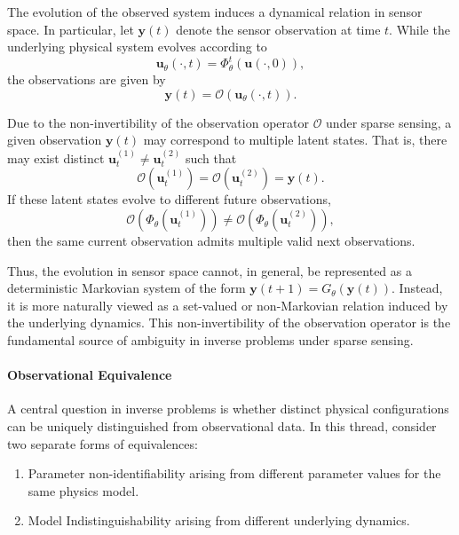 The evolution of the observed system induces a dynamical relation in sensor space. In particular, let $\mathbf{y}(t)$ denote the sensor observation at time $t$. While the underlying physical system evolves according to
\begin{equation}
\mathbf{u}_\theta(\cdot,t) = \Phi_\theta^t(\mathbf{u}(\cdot,0)), \nonumber
\end{equation}
the observations are given by
\begin{equation}
\mathbf{y}(t) = \mathcal{O}(\mathbf{u}_\theta(\cdot,t)). \nonumber
\end{equation}

Due to the non-invertibility of the observation operator $\mathcal{O}$ under sparse sensing, a given observation $\mathbf{y}(t)$ may correspond to multiple latent states. That is, there may exist distinct $\mathbf{u}_t^{(1)} \neq \mathbf{u}_t^{(2)}$ such that
\begin{equation}
\mathcal{O}(\mathbf{u}_t^{(1)}) = \mathcal{O}(\mathbf{u}_t^{(2)}) = \mathbf{y}(t). \nonumber
\end{equation}
If these latent states evolve to different future observations,
\begin{equation}
\mathcal{O}\!\left(\Phi_\theta(\mathbf{u}_t^{(1)})\right) \neq 
\mathcal{O}\!\left(\Phi_\theta(\mathbf{u}_t^{(2)})\right), \nonumber
\end{equation}
then the same current observation admits multiple valid next observations.

Thus, the evolution in sensor space cannot, in general, be represented as a deterministic Markovian system of the form $\mathbf{y}(t+1) = G_\theta(\mathbf{y}(t))$. Instead, it is more naturally viewed as a set-valued or non-Markovian relation induced by the underlying dynamics. This non-invertibility of the observation operator is the fundamental source of ambiguity in inverse problems under sparse sensing.

\paragraph{Observational Equivalence}
A central question in inverse problems is whether distinct physical configurations can be uniquely distinguished from observational data. In this thread, consider two separate forms of equivalences:
\begin{enumerate}[itemsep=0pt,topsep=0pt]
    \item Parameter non-identifiability arising from different parameter values for the same physics model.
    \item Model Indistinguishability arising from different underlying dynamics.
\end{enumerate}

